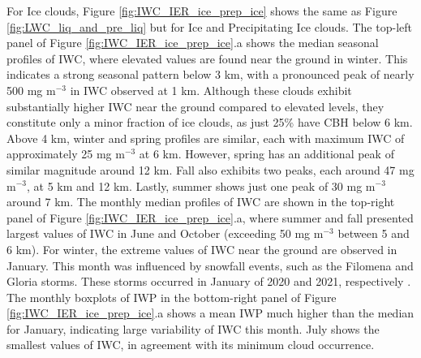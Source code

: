 For Ice clouds, Figure \ref{fig:IWC_IER_ice_prep_ice} shows the same as Figure \ref{fig:LWC_liq_and_pre_liq} but for Ice and Precipitating Ice clouds. The top-left panel of Figure \ref{fig:IWC_IER_ice_prep_ice}.a shows the median seasonal profiles of IWC, where elevated values are found near the ground in winter. This indicates a strong seasonal pattern below 3 km, with a pronounced peak of nearly 500 mg m$^{-3}$ in IWC observed at 1 km. Although these clouds exhibit substantially higher IWC near the ground compared to elevated levels, they constitute only a minor fraction of ice clouds, as just 25\% have CBH below 6 km. Above 4 km, winter and spring profiles are similar, each with maximum IWC of approximately 25 mg m$^{-3}$ at 6 km. However, spring has an additional peak of similar magnitude around 12 km. Fall also exhibits two peaks, each around 47 mg m$^{-3}$, at 5 km and 12 km. Lastly, summer shows just one peak of 30 mg m$^{-3}$ around 7 km. The monthly median profiles of IWC are shown in the top-right panel of Figure \ref{fig:IWC_IER_ice_prep_ice}.a, where summer and fall presented largest values of IWC in June and October (exceeding 50 mg m$^{-3}$ between 5 and 6 km). For winter, the extreme values of IWC near the ground are observed in January. This month was influenced by snowfall events, such as the Filomena and Gloria storms. These storms occurred in January of 2020 and 2021, respectively \citep{buisanAdjustmentSolidPrecipitation2022,perez-gonzalezEvaluationImpactCaused2022,martadealfonsoStormGloriaSea2021}. The monthly boxplots of IWP in the bottom-right panel of Figure \ref{fig:IWC_IER_ice_prep_ice}.a shows a mean IWP much higher than the median for January, indicating large variability of IWC this month. July shows the smallest values of IWC, in agreement with its minimum cloud occurrence.


